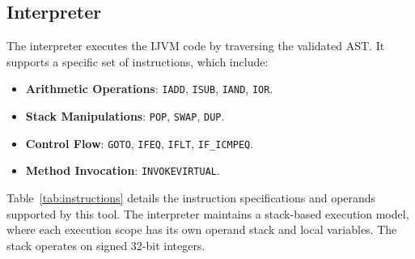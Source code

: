 \documentclass[11pt]{article}
\begin{document}
\subsection{Interpreter}
The interpreter executes the IJVM code by traversing the validated AST. It supports a specific set of instructions, which include:

\begin{itemize}
    \item \textbf{Arithmetic Operations}: \texttt{IADD}, \texttt{ISUB}, \texttt{IAND}, \texttt{IOR}.
    \item \textbf{Stack Manipulations}: \texttt{POP}, \texttt{SWAP}, \texttt{DUP}.
    \item \textbf{Control Flow}: \texttt{GOTO}, \texttt{IFEQ}, \texttt{IFLT}, \texttt{IF\_ICMPEQ}.
    \item \textbf{Method Invocation}: \texttt{INVOKEVIRTUAL}.
\end{itemize}

Table~\ref{tab:instructions} details the instruction specifications and operands supported by this tool. The interpreter maintains a stack-based execution model, where each execution scope has its own operand stack and local variables. The stack operates on signed 32-bit integers.
\end{document}
